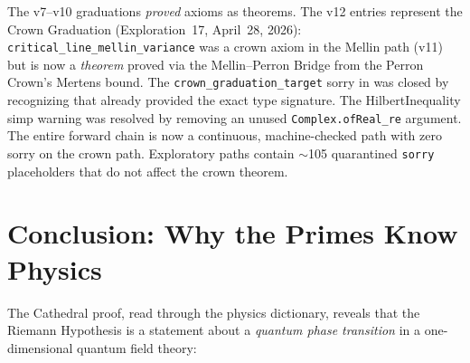 \documentclass[11pt,a4paper]{article}
\begin{document}
The v7--v10 graduations \emph{proved} axioms as theorems. The v12 entries
represent the Crown Graduation (Exploration~17, April~28, 2026):
\texttt{critical\_line\_mellin\_variance} was a crown axiom
in the Mellin path (v11) but is now a \emph{theorem} proved via the
Mellin--Perron Bridge from the Perron Crown's Mertens bound.
The \texttt{crown\_graduation\_target} sorry in 
was closed by recognizing that 
already provided the exact type signature. The HilbertInequality simp warning
was resolved by removing an unused \texttt{Complex.ofReal\_re} argument.
The entire forward chain is now a continuous, machine-checked path with
zero sorry on the crown path. Exploratory paths contain $\sim$105
quarantined \texttt{sorry} placeholders that do not affect the crown theorem.




\section{Conclusion: Why the Primes Know Physics}

The Cathedral proof, read through the physics dictionary, reveals that
the Riemann Hypothesis is a statement about a \emph{quantum phase
transition} in a one-dimensional quantum field theory:
\end{document}
